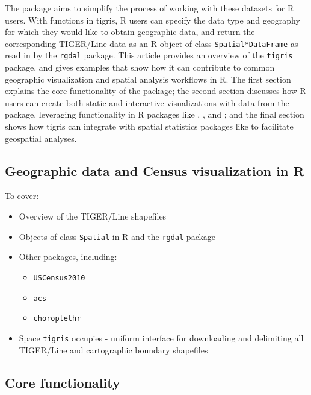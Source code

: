 The  package aims to simplify the process of working
with these datasets for R users. With functions in tigris, R users can
specify the data type and geography for which they would like to obtain
geographic data, and return the corresponding TIGER/Line data as an R
object of class \texttt{Spatial*DataFrame} as read in by the
\texttt{rgdal} package. This article provides an overview of the
\texttt{tigris} package, and gives examples that show how it can
contribute to common geographic visualization and spatial analysis
workflows in R. The first section explains the core functionality of the
package; the second section discusses how R users can create both static
and interactive visualizations with data from the package, leveraging
functionality in R packages like , , and
; and the final section shows how tigris can integrate
with spatial statistics packages like  to facilitate
geospatial analyses.

\subsection{Geographic data and Census visualization in
R}\label{geographic-data-and-census-visualization-in-r}

To cover:

\begin{itemize}
\tightlist
\item
  Overview of the TIGER/Line shapefiles
\item
  Objects of class \texttt{Spatial} in R and the \texttt{rgdal} package
\item
  Other packages, including:

  \begin{itemize}
  \tightlist
  \item
    \texttt{USCensus2010}
  \item
    \texttt{acs}
  \item
    \texttt{choroplethr}
  \end{itemize}
\item
  Space \texttt{tigris} occupies - uniform interface for downloading and
  delimiting all TIGER/Line and cartographic boundary shapefiles
\end{itemize}

\subsection{Core functionality}\label{core-functionality}

